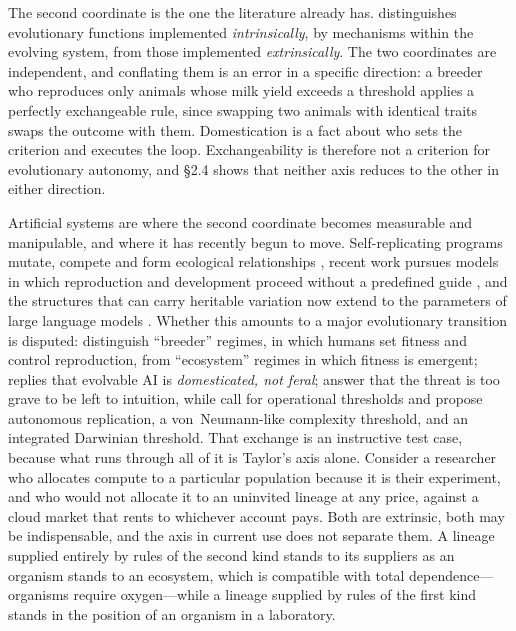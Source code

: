 \documentclass[review,3p,times]{elsarticle}
\begin{document}
The second coordinate is the one the literature already has. \citet{taylor2019}
distinguishes evolutionary functions implemented \emph{intrinsically}, by
mechanisms within the evolving system, from those implemented
\emph{extrinsically}. The two coordinates are independent, and conflating them
is an error in a specific direction: a breeder who reproduces only animals
whose milk yield exceeds a threshold applies a perfectly exchangeable rule,
since swapping two animals with identical traits swaps the outcome with them.
Domestication is a fact about who sets the criterion and executes the loop.
Exchangeability is therefore not a criterion for evolutionary autonomy, and
\S2.4 shows that neither axis reduces to the other in either direction.

Artificial systems are where the second coordinate becomes measurable and
manipulable, and where it has recently begun to move. Self-replicating
programs mutate, compete and form ecological relationships
\citep{ray1991,ofria2004,lehman2020}, recent work pursues models in which
reproduction and development proceed without a predefined guide
\citep{utimula2025}, and the structures that can carry heritable variation now
extend to the parameters of large language models \citep{zhang2026}. Whether
this amounts to a major evolutionary transition is disputed:
\citet{muller2026} distinguish ``breeder'' regimes, in which humans set
fitness and control reproduction, from ``ecosystem'' regimes in which fitness
is emergent; \citet{boudry2026} replies that evolvable AI is
\emph{domesticated, not feral}; \citet{mullerreply2026} answer that the threat
is too grave to be left to intuition, while \citet{rana2026} call for
operational thresholds and \citet{mullerthresholds2026} propose autonomous
replication, a von~Neumann-like complexity threshold, and an integrated
Darwinian threshold. That exchange is an instructive test case, because what
runs through all of it is Taylor's axis alone. Consider a researcher who
allocates compute to a particular population because it is their experiment,
and who would not allocate it to an uninvited lineage at any price, against a
cloud market that rents to whichever account pays. Both are extrinsic, both
may be indispensable, and the axis in current use does not separate them. A
lineage supplied entirely by rules of the second kind stands to its suppliers
as an organism stands to an ecosystem, which is compatible with total
dependence---organisms require oxygen---while a lineage supplied by rules of
the first kind stands in the position of an organism in a laboratory.
\end{document}
